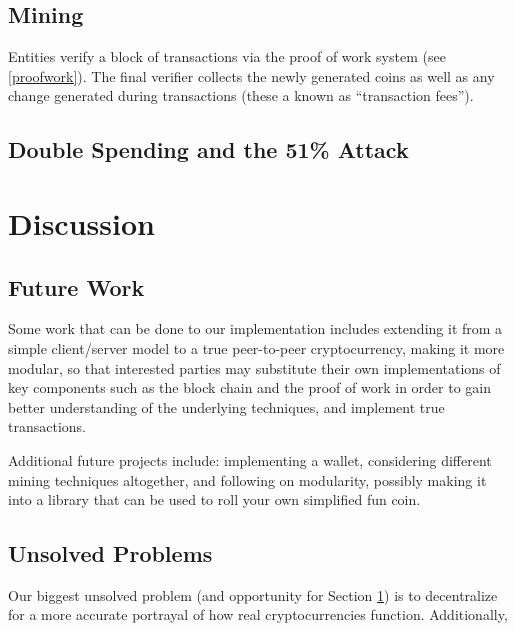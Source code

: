 \documentclass[12pt]{article}
\begin{document}
\subsection{Mining}
Entities verify a block of transactions via the proof of work system (see \ref{proofwork}).
The final verifier collects the newly generated coins as well as any change generated during
transactions (these a known as ``transaction fees''). 

\subsection{Double Spending and the 51\% Attack}\label{doublespend}

\section{Discussion}\label{future}
\subsection{Future Work}\label{work}
Some work that can be done to our implementation includes extending it from a simple client/server model to a true peer-to-peer cryptocurrency, making it more modular, so that interested parties may substitute their own implementations of key components such as the block chain and the proof of work in order to gain better understanding of the underlying techniques, and implement true transactions. 

Additional future projects include: implementing a wallet, considering different mining techniques altogether, and following on modularity, possibly making it into a library that can be used to roll your own simplified fun coin.

\subsection{Unsolved Problems}\label{unsolved}
Our biggest unsolved problem (and opportunity for Section \ref{future}) is to decentralize for a more accurate portrayal of how real cryptocurrencies function. Additionally, 



\end{document}
